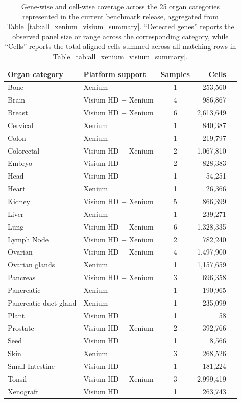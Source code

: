 \documentclass{article}
\begin{document}
\begin{table}[t]
\centering
\scriptsize
\setlength{\tabcolsep}{4pt}
\caption{Gene-wise and cell-wise coverage across the 25 organ categories represented in the current benchmark release, aggregated from Table~\ref{tab:all_xenium_visium_summary}. ``Detected genes'' reports the observed panel size or range across the corresponding category, while ``Cells'' reports the total aligned cells summed across all matching rows in Table~\ref{tab:all_xenium_visium_summary}.}
\label{tab:organ_gene_cell_coverage}
\begin{tabular}{l l c r l}
\toprule
\textbf{Organ category} & \textbf{Platform support} & \textbf{Samples} & \textbf{Cells} \\
\midrule
Bone & Xenium & 1 & 253,560\\
Brain & Visium HD + Xenium & 4 & 986,867\\
Breast & Visium HD + Xenium & 6 & 2,613,649\\
Cervical & Xenium & 1 & 840,387\\
Colon & Xenium & 1 & 219,797\\
Colorectal & Visium HD + Xenium & 2 & 1,067,810\\
Embryo & Visium HD & 2 & 828,383\\
Head & Visium HD & 1 & 54,251\\
Heart & Xenium & 1 & 26,366\\
Kidney & Visium HD + Xenium & 5 & 866,399\\
Liver & Xenium & 1 & 239,271\\
Lung & Visium HD + Xenium & 6 & 1,328,335\\
Lymph Node & Visium HD + Xenium & 2 & 782,240 \\
Ovarian & Visium HD + Xenium & 4 & 1,497,900\\
Ovarian glands & Xenium & 1 & 1,157,659\\
Pancreas & Visium HD + Xenium & 3 & 696,358\\
Pancreatic & Xenium & 1 & 190,965\\
Pancreatic duct gland & Xenium & 1 & 235,099\\
Plant & Visium HD & 1 & 58\\
Prostate & Visium HD + Xenium & 2 & 392,766\\
Seed & Visium HD & 1 & 8,566\\
Skin & Xenium & 3 & 268,526\\
Small Intestine & Visium HD & 1 & 181,224\\
Tonsil & Visium HD + Xenium & 3 & 2,999,419\\
Xenograft & Visium HD & 1 & 263,743\\
\bottomrule
\end{tabular}
\end{table}
\end{document}
